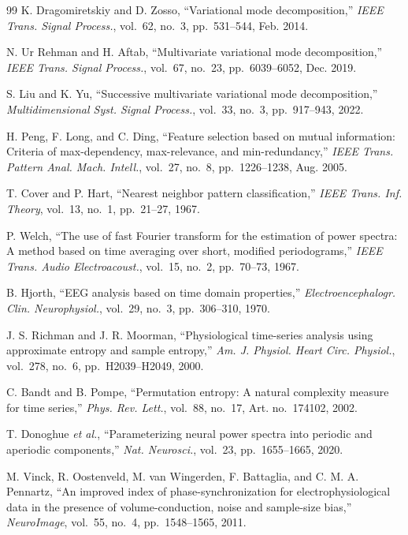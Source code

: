 \begin{thebibliography}{99}
 K. Dragomiretskiy and D. Zosso, ``Variational mode
decomposition,'' \emph{IEEE Trans. Signal Process.}, vol.~62, no.~3, pp.~531--544, Feb. 2014.

 N. Ur Rehman and H. Aftab, ``Multivariate variational mode
decomposition,'' \emph{IEEE Trans. Signal Process.}, vol.~67, no.~23, pp.~6039--6052, Dec. 2019.

 S. Liu and K. Yu, ``Successive multivariate variational mode
decomposition,'' \emph{Multidimensional Syst. Signal Process.}, vol.~33, no.~3,
pp.~917--943, 2022.

 H. Peng, F. Long, and C. Ding, ``Feature selection based on mutual
information: Criteria of max-dependency, max-relevance, and min-redundancy,'' \emph{IEEE
Trans. Pattern Anal. Mach. Intell.}, vol.~27, no.~8, pp.~1226--1238, Aug. 2005.

 T. Cover and P. Hart, ``Nearest neighbor pattern classification,''
\emph{IEEE Trans. Inf. Theory}, vol.~13, no.~1, pp.~21--27, 1967.

 P. Welch, ``The use of fast Fourier transform for the estimation of power
spectra: A method based on time averaging over short, modified periodograms,'' \emph{IEEE
Trans. Audio Electroacoust.}, vol.~15, no.~2, pp.~70--73, 1967.

 B. Hjorth, ``EEG analysis based on time domain properties,''
\emph{Electroencephalogr. Clin. Neurophysiol.}, vol.~29, no.~3, pp.~306--310, 1970.

 J. S. Richman and J. R. Moorman, ``Physiological time-series analysis
using approximate entropy and sample entropy,'' \emph{Am. J. Physiol. Heart Circ. Physiol.},
vol.~278, no.~6, pp.~H2039--H2049, 2000.

 C. Bandt and B. Pompe, ``Permutation entropy: A natural complexity measure
for time series,'' \emph{Phys. Rev. Lett.}, vol.~88, no.~17, Art. no.~174102, 2002.

 T. Donoghue \emph{et al.}, ``Parameterizing neural power spectra into
periodic and aperiodic components,'' \emph{Nat. Neurosci.}, vol.~23, pp.~1655--1665, 2020.

 M. Vinck, R. Oostenveld, M. van Wingerden, F. Battaglia, and C. M. A.
Pennartz, ``An improved index of phase-synchronization for electrophysiological data in the
presence of volume-conduction, noise and sample-size bias,'' \emph{NeuroImage}, vol.~55, no.~4,
pp.~1548--1565, 2011.


\end{thebibliography}
